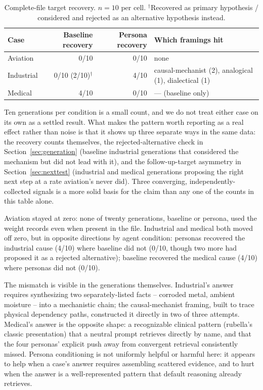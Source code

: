 \documentclass[11pt]{article}
\begin{document}
\begin{table}[h]
\centering
\small
\begin{tabular}{@{}lrrl@{}}
\toprule
Case & Baseline recovery & Persona recovery & Which framings hit \\
\midrule
Aviation   & 0/10 & 0/10 & none \\
Industrial & 0/10 (2/10)$^\dagger$ & 4/10 & causal-mechanist (2), analogical (1), dialectical (1) \\
Medical    & 4/10 & 0/10 & --- (baseline only) \\
\bottomrule
\end{tabular}
\caption{Complete-file target recovery. $n=10$ per cell.
$^\dagger$Recovered as primary hypothesis / considered and rejected as an
alternative hypothesis instead.}
\label{tab:fullevidence}
\end{table}

Ten generations per condition is a small count, and we do not treat
either case on its own as a settled result. What makes the pattern worth
reporting as a real effect rather than noise is that it shows up three
separate ways in the same data: the recovery counts themselves, the
rejected-alternative check in Section~\ref{sec:generation} (baseline
industrial generations that considered the mechanism but did not lead
with it), and the follow-up-target asymmetry in
Section~\ref{sec:nexttest} (industrial and medical generations proposing
the right next step at a rate aviation's never did). Three converging,
independently-collected signals is a more solid basis for the claim than
any one of the counts in this table alone.

Aviation stayed at zero: none of twenty generations, baseline or persona,
used the weight records even when present in the file. Industrial and
medical both moved off zero, but in opposite directions by agent
condition: personas recovered the industrial cause (4/10) where baseline
did not (0/10, though two more had proposed it as a rejected alternative);
baseline recovered the medical cause (4/10) where personas did not (0/10).

The mismatch is visible in the generations themselves. Industrial's answer
requires synthesizing two separately-listed facts -- corroded metal,
ambient moisture -- into a mechanistic chain; the causal-mechanist framing,
built to trace physical dependency paths, constructed it directly in two
of three attempts. Medical's answer is the opposite shape: a recognizable
clinical pattern (rubella's classic presentation) that a neutral prompt
retrieves directly by name, and that the four personas' explicit push away
from convergent retrieval consistently missed. Persona conditioning is not
uniformly helpful or harmful here: it appears to help when a case's answer
requires assembling scattered evidence, and to hurt when the answer is a
well-represented pattern that default reasoning already retrieves.
\end{document}
